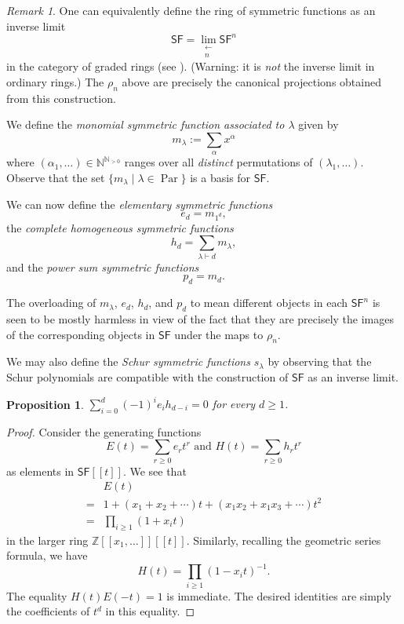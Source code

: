 \documentclass[12pt]{article}
\theoremstyle{plain}
\newtheorem{proposition}[theorem]{Proposition}
\theoremstyle{definition}
\theoremstyle{remark}
\newtheorem{remark}[theorem]{Remark}
\numberwithin{equation}{section}
\begin{document}
\begin{remark}
One can equivalently define the ring of symmetric functions as an inverse
limit
\[
\mathsf{SF} = \lim_{\substack{\longleftarrow\\n}} \mathsf{SF}^n
\]
in the category of graded rings (see \cite{Macdonald}).
(Warning: it is \emph{not} the inverse limit in ordinary rings.)
The $\rho_n$ above are precisely the canonical projections obtained from
this construction.
\end{remark}

We define the \emph{monomial symmetric function associated to $\lambda$}
given by
\[
m_\lambda := \sum_{\alpha} x^\alpha
\]
where $(\alpha_1,\ldots) \in \mathbb{N}^{\mathbb{N}_{>0}}$ ranges over all
\emph{distinct} permutations of $(\lambda_1,\ldots)$.
Observe that the set $\{ m_\lambda \mid \lambda \in
\operatorname{Par}\}$ is a basis for $\mathsf{SF}$.

We can now define the \emph{elementary symmetric functions}
\[
e_d = m_{1^d},
\]
the \emph{complete homogeneous symmetric functions}
\[
h_d = \sum_{\lambda \vdash d} m_\lambda ,
\]
and the \emph{power sum symmetric functions}
\[
p_d = m_{d}.
\]

The overloading of $m_\lambda$, $e_d$, $h_d$, and $p_d$ to mean
different objects in each $\mathsf{SF}^n$ is seen to be mostly harmless
in view of the fact that they are precisely the images of the
corresponding objects in $\mathsf{SF}$ under the maps to $\rho_n$.

We may also define the \emph{Schur symmetric functions}
$s_\lambda$ by observing that the Schur polynomials are compatible
with the construction of $\mathsf{SF}$ as an inverse limit.

\begin{proposition} \label{prop:fund_rel}
$\displaystyle\sum_{i=0}^d (-1)^i e_i h_{d-i}=0$ for every $d \ge 1$.
\end{proposition}

\begin{proof}
Consider the generating functions
\[ E(t) = \sum_{r \ge 0} e_r t^r
\textrm{ and }
H(t) = \sum_{r \ge 0} h_r t^r \]
as elements in $\mathsf{SF}[[t]]$.
We see that
\begin{align*}
& E(t)\\
 =& 1 + (x_1+x_2+\cdots)t
+ (x_1x_2+x_1x_3+\cdots)t^2 \\
=&\prod_{i \ge 1} (1+x_i t)
\end{align*}
in the larger ring $\mathbb{Z}[[x_1,\ldots]][[t]]$.
Similarly, recalling the geometric series formula, we have
\[
H(t) = \prod_{i \ge 1} (1-x_i t)^{-1} .
\]
The equality $H(t)E(-t)=1$ is immediate.
The desired identities are simply the coefficients of $t^d$
in this equality.
\end{proof}
\end{document}
